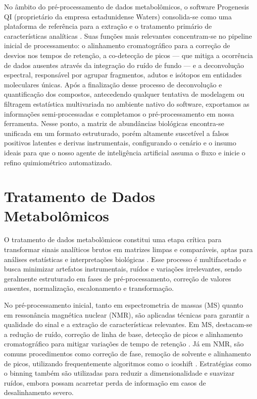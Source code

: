 No âmbito do pré-processamento de dados metabolômicos, o software Progenesis QI (proprietário da empresa estadunidense Waters) consolida-se como uma plataforma de referência para a extração e o tratamento primário de características analíticas \cite{watersprogenesisguide}. Suas funções mais relevantes concentram-se no pipeline inicial de processamento: o alinhamento cromatográfico para a correção de desvios nos tempos de retenção, a co-detecção de picos — que mitiga a ocorrência de dados ausentes através da integração do ruído de fundo — e a deconvolução espectral, responsável por agrupar fragmentos, adutos e isótopos em entidades moleculares únicas. Após a finalização desse processo de deconvolução e quantificação dos compostos, antecedendo qualquer tentativa de modelagem ou filtragem estatística multivariada no ambiente nativo do software, exportamos as informações semi-processadas e completamos o pré-processamento em nossa ferramenta. Nesse ponto, a matriz de abundâncias biológicas encontra-se unificada em um formato estruturado, porém altamente suscetível a falsos positivos latentes e derivas instrumentais, configurando o cenário e o insumo ideais para que o nosso agente de inteligência artificial assuma o fluxo e inicie o refino quimiométrico automatizado. 

\section{\textbf{Tratamento de Dados Metabolômicos}}

O tratamento de dados metabolômicos constitui uma etapa crítica para transformar sinais analíticos brutos em matrizes limpas e comparáveis, aptas para análises estatísticas e interpretações biológicas \cite{datanor,sun2024pretreating}. Esse processo é multifacetado e busca minimizar artefatos instrumentais, ruídos e variações irrelevantes, sendo geralmente estruturado em fases de pré-processamento, correção de valores ausentes, normalização, escalonamento e transformação.

No pré-processamento inicial, tanto em espectrometria de massas (MS) quanto em ressonância magnética nuclear (NMR), são aplicadas técnicas para garantir a qualidade do sinal e a extração de características relevantes. Em MS, destacam-se a redução de ruído, correção de linha de base, detecção de picos e alinhamento cromatográfico para mitigar variações de tempo de retenção \cite{sun2024pretreating}. Já em NMR, são comuns procedimentos como correção de fase, remoção de solvente e alinhamento de picos, utilizando frequentemente algoritmos como o icoshift \cite{LILAND2011827}. Estratégias como o binning também são utilizadas para reduzir a dimensionalidade e suavizar ruídos, embora possam acarretar perda de informação em casos de desalinhamento severo.

